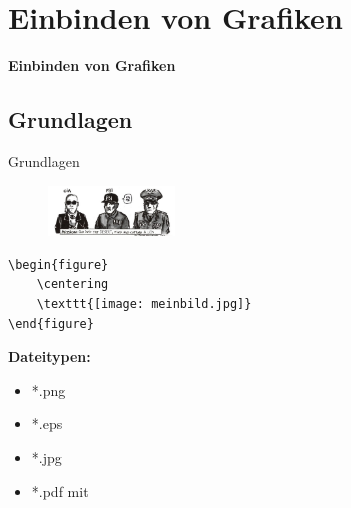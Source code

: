 \documentclass["WS\space 16-17\space -\space LaTeX-Kurs\space -\space Praesentation\space -\space 2.tex"]{subfiles}
\begin{document}
\section{Einbinden von Grafiken}
\begin{frame}[c]
	\begin{center}
		\LARGE \textbf{Einbinden von Grafiken}
	\end{center}
\end{frame}
\subsection{Grundlagen}
\begin{frame}[c]
	\begin{center}
		\large Grundlagen
	\end{center}
\end{frame}
\begin{frame}[fragile]
	\Ausgabe
	\begin{outputbox}
		\begin{figure}
			\centering
			\includegraphics[width=0.3\textwidth]{img/loewenjagd}
		\end{figure}
	\end{outputbox}

	\pause\Code
	\begin{lstlisting}
\begin{figure}
	\centering
	\texttt{[image: meinbild.jpg]}
\end{figure}
	\end{lstlisting}

	\pause\textbf{Dateitypen:}\vspace{-0.2cm}
	\begin{itemize}
		\item *.png
		\item *.eps
		\item *.jpg
		\item *.pdf mit \lstinline[basicstyle=\normalfont\ttfamily\normalsize]||
	\end{itemize}
\end{frame}
\end{document}

